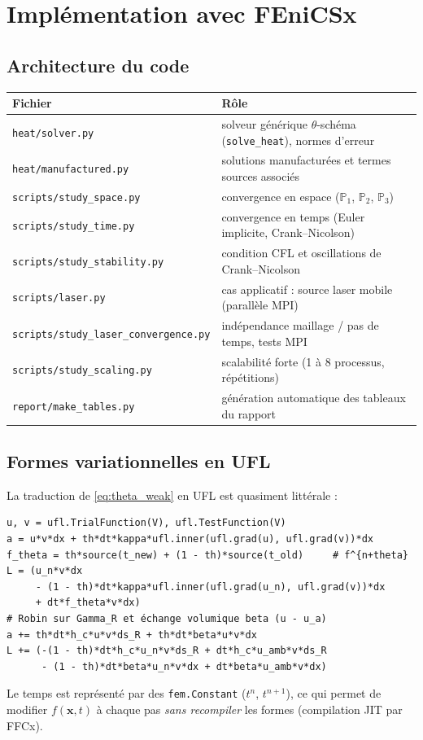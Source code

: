 \documentclass[11pt,a4paper]{article}
\begin{document}
\section{Implémentation avec FEniCSx}
\subsection{Architecture du code}
\begin{center}\small
\begin{tabular}{l l}\toprule
Fichier & Rôle \\ \midrule
\texttt{heat/solver.py} & solveur générique $\theta$-schéma (\texttt{solve\_heat}), normes d'erreur \\
\texttt{heat/manufactured.py} & solutions manufacturées et termes sources associés \\
\texttt{scripts/study\_space.py} & convergence en espace ($\mathbb{P}_1$, $\mathbb{P}_2$, $\mathbb{P}_3$) \\
\texttt{scripts/study\_time.py} & convergence en temps (Euler implicite, Crank--Nicolson) \\
\texttt{scripts/study\_stability.py} & condition CFL et oscillations de Crank--Nicolson \\
\texttt{scripts/laser.py} & cas applicatif : source laser mobile (parallèle MPI) \\
\texttt{scripts/study\_laser\_convergence.py} & indépendance maillage / pas de temps, tests MPI \\
\texttt{scripts/study\_scaling.py} & scalabilité forte (1 à 8 processus, répétitions) \\
\texttt{report/make\_tables.py} & génération automatique des tableaux du rapport \\ \bottomrule
\end{tabular}
\end{center}

\subsection{Formes variationnelles en UFL}
La traduction de \eqref{eq:theta_weak} en UFL est quasiment littérale :
\begin{lstlisting}
u, v = ufl.TrialFunction(V), ufl.TestFunction(V)
a = u*v*dx + th*dt*kappa*ufl.inner(ufl.grad(u), ufl.grad(v))*dx
f_theta = th*source(t_new) + (1 - th)*source(t_old)     # f^{n+theta}
L = (u_n*v*dx
     - (1 - th)*dt*kappa*ufl.inner(ufl.grad(u_n), ufl.grad(v))*dx
     + dt*f_theta*v*dx)
# Robin sur Gamma_R et échange volumique beta (u - u_a)
a += th*dt*h_c*u*v*ds_R + th*dt*beta*u*v*dx
L += (-(1 - th)*dt*h_c*u_n*v*ds_R + dt*h_c*u_amb*v*ds_R
      - (1 - th)*dt*beta*u_n*v*dx + dt*beta*u_amb*v*dx)
\end{lstlisting}
Le temps est représenté par des \texttt{fem.Constant} ($t^n$, $t^{n+1}$), ce qui permet de modifier
$f(\bm{x},t)$ à chaque pas \emph{sans recompiler} les formes (compilation JIT par FFCx).
\end{document}
